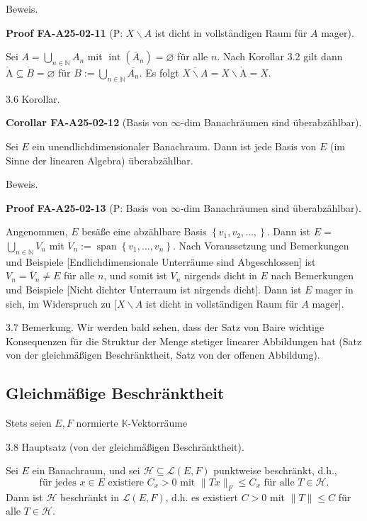 \documentclass[10pt, letterpaper]{article}
\newcommand{\CustomHeading}[3]{%
  \par\medskip\noindent%
  \textbf{#1 #2} \textnormal{(#3)}.\enskip%
}
\newenvironment{KORO}[2]{\begin{unitbox}\CustomHeading{Corollar}{#1}{#2}}{\end{unitbox}}
\newenvironment{PROOF}[2]{\begin{unitbox}\CustomHeading{Proof}{#1}{#2}}{\end{unitbox}}
\def\AA{\mathring{\mathrm{A}}}
\begin{document}
Beweis. 

\begin{PROOF}{FA-A25-02-11}{P: $X\backslash A$ ist dicht in vollständigen Raum für $A$ mager}
Sei $A=\bigcup_{n \in \mathbb{N}} A_{n}$ mit $\operatorname{int}\left(\bar{A}_{n}\right)=\varnothing$ für alle $n$. Nach Korollar 3.2 gilt dann $\AA \subseteq \dot{B}=\varnothing$ für $B:=\bigcup_{n \in \mathbb{N}} \overline{A_{n}}$. Es folgt $\overline{X \backslash A}=X \backslash \AA=X$.
\end{PROOF}


3.6 Korollar. 

\begin{KORO}{FA-A25-02-12}{Basis von $\infty$-dim Banachräumen sind überabzählbar}
Sei $E$ ein unendlichdimensionaler Banachraum. Dann ist jede Basis von $E$ (im Sinne der linearen Algebra) überabzählbar.
\end{KORO}

Beweis. 

\begin{PROOF}{FA-A25-02-13}{P: Basis von $\infty$-dim Banachräumen sind überabzählbar}
Angenommen, $E$ besäße eine abzählbare Basis $\left\{v_{1}, v_{2}, \ldots,\right\}$. Dann ist $E=$ $\bigcup_{n \in \mathbb{N}} V_{n}$ mit $V_{n}:=\operatorname{span}\left\{v_{1}, \ldots, v_{n}\right\}$. Nach Voraussetzung und Bemerkungen und Beispiele [Endlichdimensionale Unterräume sind Abgeschlossen] ist $V_{n}=\bar{V}_{n} \neq E$ für alle $n$, und somit ist $V_{n}$ nirgends dicht in $E$ nach Bemerkungen und Beispiele [Nicht dichter Unterraum ist nirgends dicht]. Dann ist $E$ mager in sich, im Widerspruch zu [$X\backslash A$ ist dicht in vollständigen Raum für $A$ mager].
\end{PROOF}


3.7 Bemerkung. Wir werden bald sehen, dass der Satz von Baire wichtige Konsequenzen für die Struktur der Menge stetiger linearer Abbildungen hat (Satz von der gleichmäßigen Beschränktheit, Satz von der offenen Abbildung).


\pagebreak

\subsection{Gleichmäßige Beschränktheit}

Stets seien $E, F$ normierte $\mathbb{K}$-Vektorräume


3.8 Hauptsatz (von der gleichmäßigen Beschränktheit). 

Sei $E$ ein Banachraum, und sei $\mathcal{H} \subseteq \mathcal{L}(E, F)$ punktweise beschränkt, d.h.,
$$
\text { für jedes } x \in E \text { existiere } C_{x}>0 \text { mit }\|T x\|_{F} \leq C_{x} \text { für alle } T \in \mathcal{H} \text {. }
$$
Dann ist $\mathcal{H}$ beschränkt in $\mathcal{L}(E, F)$, d.h. es existiert $C>0$ mit $\|T\| \leq C$ für alle $T \in \mathcal{H}$.
\end{document}
